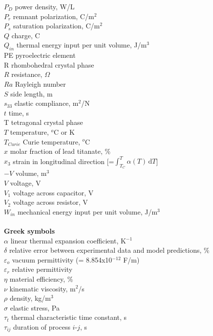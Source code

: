 \begin{tabbing}
$P_D$ \>      power density, W/L\\
$P_r$ \> 	  remnant polarization, C/m$^2$\\
$P_s$ \> 	  saturation polarization, C/m$^2$\\
$Q$ \> 	      charge, C \\
$Q_{in}$ \>     thermal energy input per unit volume, J/m$^3$ \\
PE \> 	  pyroelectric element \\
R \>       rhombohedral crystal phase \\
$R$ \> 	      resistance, $\Omega$ \\
$Ra$ \>         Rayleigh number \\
$S$ \>          side length, m \\
$s_{33}$ \>   elastic compliance, m$^{2}$/N \\
$t$ \>        time, s\\
T \>       tetragonal crystal phase \\
$T$ \>        temperature, $^o$C or K\\
$T_{Curie}$ \> Curie temperature, $^o$C\\
$x$ \>	      molar fraction of lead titanate, \%\\
$x_{3}$ \>	  strain in longitudinal direction [=$\int_{T_{C}}^{T} \! \alpha(T) \, \mathrm{d} T$] \\
$-\!\!\!\! V$ \>      volume, m$^3$ \\
$V$\>         voltage, V \\
$V_{1}$\>     voltage across capacitor, V \\
$V_{2}$\>     voltage across resistor, V \\
$W_{in}$ \>     mechanical energy input per unit volume, J/m$^3$ \\
\\

\textbf{Greek symbols} \\
$\alpha$ \>     linear thermal expansion coefficient, K$^{-1}$\\
$\delta$  \>    relative error between experimental data and model predictions, \% \\
$\varepsilon_{o}$  \> vacuum permittivity (= 8.854x10$^{-12}$ F/m) \\
$\varepsilon_{r}$ \>  relative permittivity  \\
$\eta$ \>          material efficiency, \% \\
$\nu$ \>        kinematic viscosity, m$^2$/s \\
$\rho$     \>     density, kg/m$^3$ \\
$\sigma$   \>     elastic stress, Pa \\
$\tau$$_{t}$     \>   thermal characteristic time constant, s\\
$\tau_{ij}$ \>   duration of process $i$-$j$, s\\
\\


\end{tabbing}
